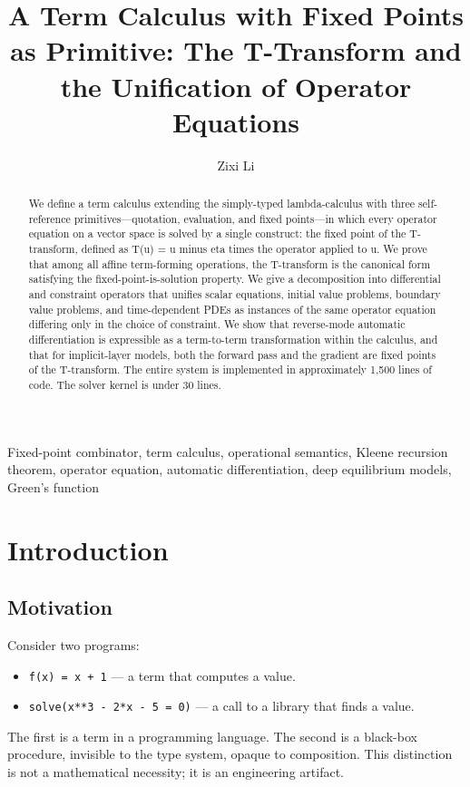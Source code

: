 \documentclass{lmcs}
\title[Fix as Primitive]{A Term Calculus with Fixed Points as Primitive:
  The T-Transform and the Unification of Operator Equations}
\author{Zixi Li}
\theoremstyle{plain}
\theoremstyle{definition}
\begin{document}
\begin{abstract}
We define a term calculus extending the simply-typed lambda-calculus with
three self-reference primitives---quotation, evaluation, and fixed
points---in which every operator equation on a vector space is solved by a
single construct: the fixed point of the T-transform, defined as
T(u) = u minus eta times the operator applied to u. We prove that among all
affine term-forming operations, the T-transform is the canonical form
satisfying the fixed-point-is-solution property. We give a decomposition into
differential and constraint operators that unifies scalar equations, initial
value problems, boundary value problems, and time-dependent PDEs as
instances of the same operator equation differing only in the choice of
constraint. We show that reverse-mode automatic differentiation is
expressible as a term-to-term transformation within the calculus, and that
for implicit-layer models, both the forward pass and the gradient are fixed
points of the T-transform. The entire system is implemented in approximately
1,500 lines of code. The solver kernel is under 30 lines.
\end{abstract}

\begin{keywords}
\mbox{Fixed-point} combinator, term calculus, operational semantics,
Kleene recursion theorem, operator equation, automatic differentiation,
deep equilibrium models, Green's function
\end{keywords}

\maketitle

\section{Introduction}

\subsection{Motivation}

Consider two programs:
\begin{itemize}
\item \texttt{f(x) = x + 1} --- a term that computes a value.
\item \texttt{solve(x**3 - 2*x - 5 = 0)} --- a call to a library that
  finds a value.
\end{itemize}
The first is a term in a programming language. The second is a black-box
procedure, invisible to the type system, opaque to composition. This
distinction is not a mathematical necessity; it is an engineering artifact.
\end{document}
